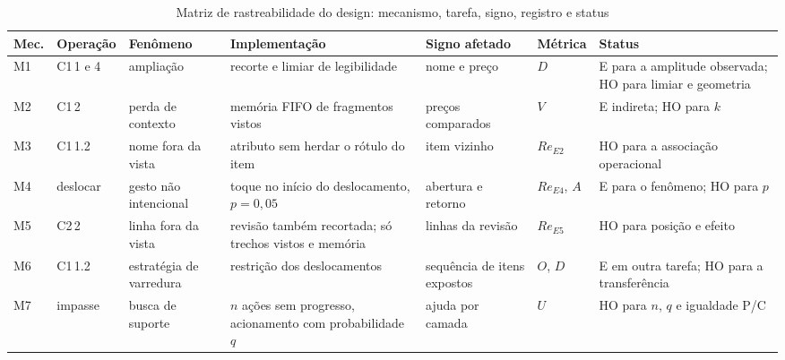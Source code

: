 \begin{table}[!t]
\caption{Matriz de rastreabilidade do design: mecanismo, tarefa, signo, registro e status}
\label{tab:trace}
\centering\scriptsize\setlength{\tabcolsep}{3pt}\renewcommand{\arraystretch}{1.1}
\begin{tabularx}{\textwidth}{@{}>{\raggedright\arraybackslash}p{}>{\raggedright\arraybackslash}p{}>{\raggedright\arraybackslash}p{}>{\raggedright\arraybackslash}X>{\raggedright\arraybackslash}p{}>{\raggedright\arraybackslash}p{}>{\raggedright\arraybackslash}p{}@{}}
\hline \textbf{Mec.} & \textbf{Operação} & \textbf{Fenômeno} & \textbf{Implementação} & \textbf{Signo afetado} & \textbf{Métrica} & \textbf{Status}\\ \hline
M1 & C1\,1 e 4 & ampliação & recorte e limiar de legibilidade & nome e preço & $D$ & E para a amplitude observada; HO para limiar e geometria\\
M2 & C1\,2 & perda de contexto & memória FIFO de fragmentos vistos & preços comparados & $V$ & E indireta; HO para $k$\\
M3 & C1\,1.2 & nome fora da vista & atributo sem herdar o rótulo do item & item vizinho & $Re_{E2}$ & HO para a associação operacional\\
M4 & deslocar & gesto não intencional & toque no início do deslocamento, $p=0{,}05$ & abertura e retorno & $Re_{E4}$, $A$ & E para o fenômeno; HO para $p$\\
M5 & C2\,2 & linha fora da vista & revisão também recortada; só trechos vistos e memória & linhas da revisão & $Re_{E5}$ & HO para posição e efeito\\
M6 & C1\,1.2 & estratégia de varredura & restrição dos deslocamentos & sequência de itens expostos & $O$, $D$ & E em outra tarefa; HO para a transferência\\
M7 & impasse & busca de suporte & $n$ ações sem progresso, acionamento com probabilidade $q$ & ajuda por camada & $U$ & HO para $n$, $q$ e igualdade P/C\\ \hline
\end{tabularx}
\end{table}
